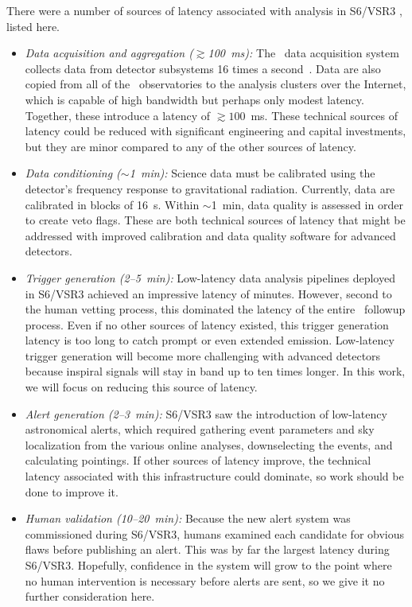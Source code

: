 There were a number of sources of latency associated with \CBC{}
analysis in S6/VSR3 \citep{HugheyGWPAW2011}, listed here.
%
\begin{itemize}
%
\item {\it Data acquisition and aggregation ($\gtrsim$100~ms):}
The \LIGO\ data acquisition system collects data from detector subsystems 16
times a second~\citep{Bork2001}. Data are also copied from all of the \GW\
observatories to the analysis clusters over the Internet, which is capable of
high bandwidth but perhaps only modest latency.  Together, these introduce a
latency of $\gtrsim 100$~ms.  These technical sources of latency could be reduced
with significant engineering and capital investments, but they are minor compared
to any of the other sources of latency.
%
\item {\it Data conditioning
($\sim$1~min):} Science data must be calibrated using the detector's frequency
response to gravitational radiation.  Currently, data are calibrated in blocks of
16~s.  Within $\sim$1~min, data quality is assessed in order to create veto flags.
These are both technical sources of latency that might be addressed with improved
calibration and data quality software for advanced detectors.
%
\item {\it Trigger generation (2--5~min):} Low-latency data analysis pipelines
deployed in S6/VSR3 achieved an impressive latency of minutes.  However, second
to the human vetting process, this dominated the latency of the entire \EM\
followup process.  Even if no other sources of latency existed, this trigger
generation latency is too long to catch prompt or even extended emission.
Low-latency trigger generation will become more challenging with advanced detectors
because inspiral signals will stay in band up to ten times longer.  In this work,
we will focus on reducing this source of latency.
%
\item {\it Alert generation
(2--3~min):} S6/VSR3 saw the introduction of low-latency astronomical
alerts, which required gathering event parameters and sky localization from the
various online analyses, downselecting the events, and calculating pointings.
If other sources of latency improve, the technical latency associated with this
infrastructure could dominate, so work should be done to improve it.
%
\item {\it Human validation (10--20~min):} Because the new alert system was
commissioned during S6/VSR3, humans examined each candidate for obvious flaws
before publishing an alert. This was by far the largest latency during S6/VSR3.
Hopefully, confidence in the system will grow to the point where no human intervention
is necessary before alerts are sent, so we give it no further consideration here.
%
\end{itemize}

